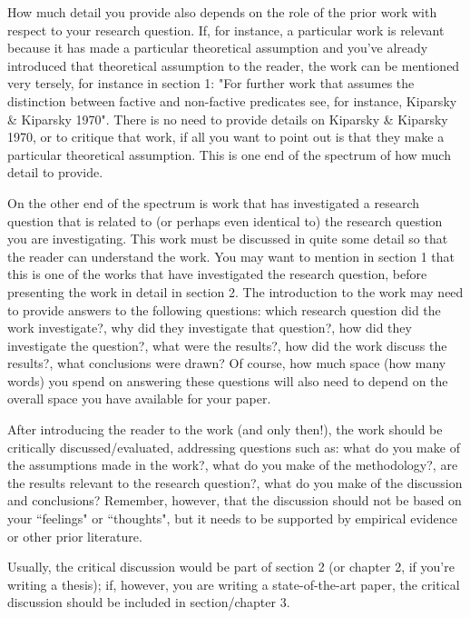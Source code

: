 \documentclass[11pt,fleqn,a4paper/thesis]{article}
\newcommand{\6}{\mbox{$[\hspace*{-.6mm}[$}}
\newcommand{\9}{\mbox{$]\hspace*{-.6mm}]$}}
\begin{document}
\begin{itemize}[itemsep=-1pt,leftmargin=2.5ex,topsep=-2pt]
\begin{enumerate}
How much detail you provide also depends on the role of the prior work with respect to your research question. If, for instance, a particular work is relevant because it has made a particular theoretical assumption and you've already introduced that theoretical assumption to the reader, the work can be mentioned very tersely, for instance in section 1: "For further work that assumes the distinction between factive and non-factive predicates see, for instance, Kiparsky \& Kiparsky 1970". There is no need to provide details on Kiparsky \& Kiparsky 1970, or to critique that work, if all you want to point out is that they make a particular theoretical assumption. This is one end of the spectrum of how much detail to provide. 

On the other end of the spectrum is work that has investigated a research question that is related to (or perhaps even identical to) the research question you are investigating. This work must be discussed in quite some detail so that the reader can understand the work. You may want to mention in section 1 that this is one of the works that have investigated the research question, before presenting the work in detail in section 2. The introduction to the work may need to provide answers to the following questions: which research question did the work investigate?, why did they investigate that question?, how did they investigate the question?, what were the results?, how did the work discuss the results?, what conclusions were drawn? Of course, how much space (how many words) you spend on answering these questions will also need to depend on the overall space you have available for your paper. 

\end{enumerate}


After introducing the reader to the work (and only then!), the work should be critically discussed/evaluated, addressing questions such as: what do you make of the assumptions made in the work?, what do you make of the methodology?, are the results relevant to the research question?, what do you make of the discussion and conclusions? Remember, however, that the discussion should not be based on your ``feelings" or ``thoughts", but it needs to be supported by empirical evidence or other prior literature. 

Usually, the critical discussion would be part of section 2 (or chapter 2, if you're writing a thesis); if, however, you are writing a state-of-the-art paper, the critical discussion should be included in section/chapter 3. 

\end{itemize}
\end{document}
